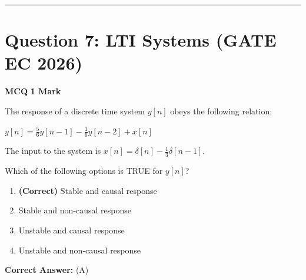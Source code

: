 \documentclass[11pt,a4paper]{article}
\begin{document}
\vspace{1.5em}
\hrule
\vspace{1.5em}

\section*{Question 7: LTI Systems (GATE EC 2026)}
\noindent \textbf{\color{primary}MCQ} \hfill \textbf{\color{secondary}1 Mark}


\noindent The response of a discrete time system $y[n]$ obeys the following relation:

$y[n] = \frac{5}{6}y[n - 1] - \frac{1}{6}y[n - 2] + x[n]$

The input to the system is $x[n] = \delta[n] - \frac{1}{3}\delta[n - 1]$. 

Which of the following options is TRUE for $y[n]$?


\begin{enumerate}[label=(\Alph*)]
    \item \textbf{(Correct)} Stable and causal response
    \item Stable and non-causal response
    \item Unstable and causal response
    \item Unstable and non-causal response
\end{enumerate}

\noindent \textbf{Correct Answer:} (A)
\end{document}
